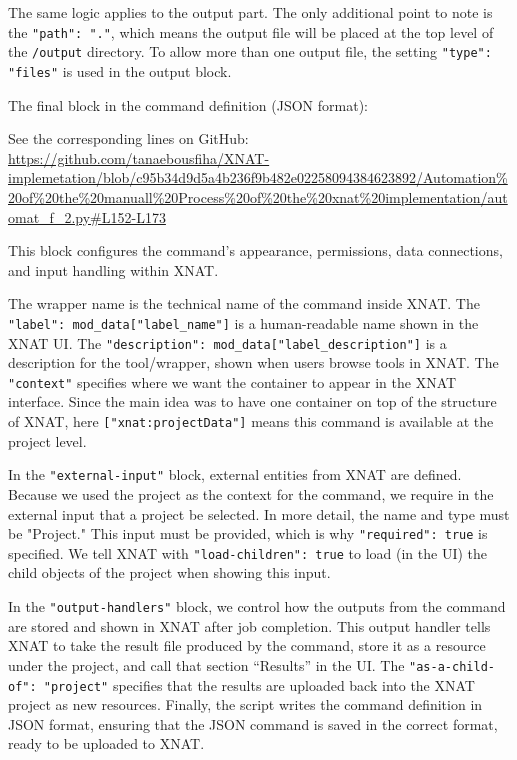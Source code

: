 The same logic applies to the output part. The only additional point to note is the \texttt{"path": "."}, which means the output file will be placed at the top level of the \texttt{/output} directory. To allow more than one output file, the setting \texttt{"type": "files"} is used in the output block.

The final block in the command definition (JSON format):




\noindent\footnotesize See the corresponding lines on GitHub:\url{ https://github.com/tanaebousfiha/XNAT-implemetation/blob/c95b34d9d5a4b236f9b482e02258094384623892/Automation%20of%20the%20manuall%20Process%20of%20the%20xnat%20implementation/automat_f_2.py#L152-L173}
\normalsize



This block configures the command's appearance, permissions, data connections, and input handling within XNAT.

The wrapper name is the technical name of the command inside XNAT. The \texttt{"label": mod\_data["label\_name"]} is a human-readable name shown in the XNAT \ac{UI}. The \texttt{"description": mod\_data["label\_description"]} is a description for the tool/wrapper, shown when users browse tools in XNAT. The \texttt{"context"} specifies where we want the container to appear in the XNAT interface. Since the main idea was to have one container on top of the structure of XNAT, here \texttt{["xnat:projectData"]} means this command is available at the project level.


In the \texttt{"external-input"} block, external entities from XNAT are defined. Because we used the project as the context for the command, we require in the external input that a project be selected. In more detail, the name and type must be "Project." This input must be provided, which is why \texttt{"required": true} is specified. We tell XNAT with \texttt{"load-children": true} to load (in the UI) the child objects of the project when showing this input.

In the \texttt{"output-handlers"} block, we control how the outputs from the command are stored and shown in XNAT after job completion. This output handler tells XNAT to take the result file produced by the command, store it as a resource under the project, and call that section ``Results'' in the UI. The \texttt{"as-a-child-of": "project"} specifies that the results are uploaded back into the XNAT project as new resources.
\normalsize
Finally, the script writes the command definition in JSON format, ensuring that the JSON command is saved in the correct format, ready to be uploaded to XNAT.

